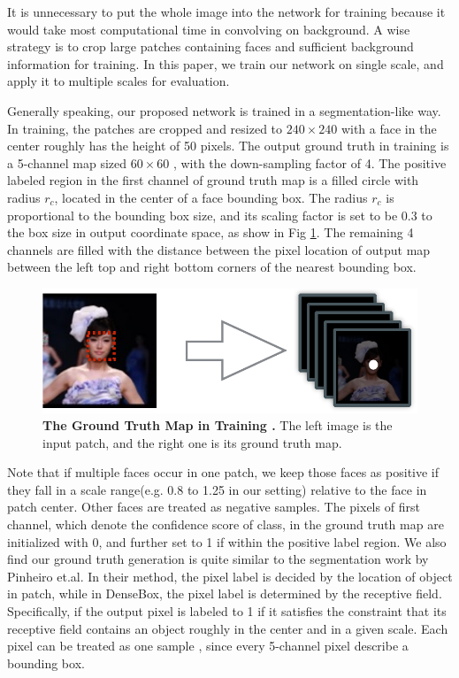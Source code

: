 It is unnecessary to put the whole image into the network for training because it would take most computational time in convolving on background. A wise strategy is to crop large patches containing faces and sufficient background information for training. In this paper, we train our network on single scale, and apply it to multiple scales for evaluation. 

Generally speaking, our proposed network is trained in a segmentation-like way.   In training, the patches are cropped and resized to $240 \times 240$ with a face in the center roughly has the height of 50 pixels. The output ground truth in training is a 5-channel map sized $60 \times 60 $ , with the down-sampling factor of 4. The positive labeled region in the first channel of ground truth map is a filled circle with radius $r_c$, located in the center of a face bounding box. The radius $r_c$ is proportional to the bounding box size, and its scaling factor is set to be 0.3 to the box size in output coordinate space, as show in Fig \ref{fig:fig_gt}. The remaining 4 channels are filled with the distance between the pixel location of output map between the left top and right bottom corners of the nearest bounding box.  


	\begin{figure}[!hbtp]
	\centering
	 \includegraphics[scale=0.55]{figures/figure2-crop.pdf}
	\caption{\textbf{The Ground Truth Map in Training .} The left image is the input patch, and the right one is its ground truth map. }
	\label{fig:fig_gt}
	\end{figure}

Note that if multiple faces occur in one patch, we keep those faces as positive if they fall in a scale range(e.g. 0.8 to 1.25 in our setting) relative to the face in patch center. Other faces are treated as negative samples. The pixels of first channel, which denote the confidence score of class, in the ground truth map are initialized with 0, and further set to 1 if within the positive label region.  We also find our ground truth generation is quite similar to the segmentation work\cite{pinheiro2015learning} by Pinheiro et.al.   In their method, the pixel label is decided by the location of object in patch, while in DenseBox, the pixel label is determined by the receptive field. Specifically, if the output pixel is labeled to 1 if it satisfies the constraint that its receptive field contains an object roughly in the center and in a given scale. Each pixel can be treated as one sample , since every 5-channel pixel describe a bounding box.


